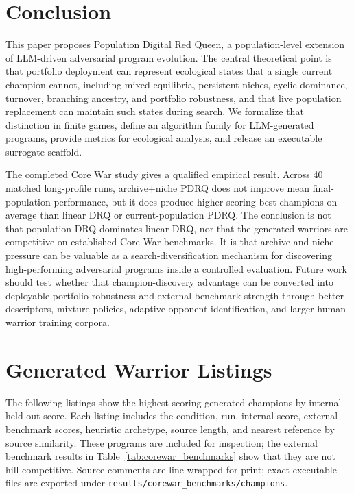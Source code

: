 \documentclass[11pt]{article}
\begin{document}
\section{Conclusion}

This paper proposes Population Digital Red Queen, a population-level extension of LLM-driven adversarial program evolution. The central theoretical point is that portfolio deployment can represent ecological states that a single current champion cannot, including mixed equilibria, persistent niches, cyclic dominance, turnover, branching ancestry, and portfolio robustness, and that live population replacement can maintain such states during search. We formalize that distinction in finite games, define an algorithm family for LLM-generated programs, provide metrics for ecological analysis, and release an executable surrogate scaffold.

The completed Core War study gives a qualified empirical result. Across 40 matched long-profile runs, archive+niche PDRQ does not improve mean final-population performance, but it does produce higher-scoring best champions on average than linear DRQ or current-population PDRQ. The conclusion is not that population DRQ dominates linear DRQ, nor that the generated warriors are competitive on established Core War benchmarks. It is that archive and niche pressure can be valuable as a search-diversification mechanism for discovering high-performing adversarial programs inside a controlled evaluation. Future work should test whether that champion-discovery advantage can be converted into deployable portfolio robustness and external benchmark strength through better descriptors, mixture policies, adaptive opponent identification, and larger human-warrior training corpora.

\appendix
\section{Generated Warrior Listings}
\label{app:generated_warriors}

The following listings show the highest-scoring generated champions by internal held-out score. Each listing includes the condition, run, internal score, external benchmark scores, heuristic archetype, source length, and nearest reference by source similarity. These programs are included for inspection; the external benchmark results in Table~\ref{tab:corewar_benchmarks} show that they are not hill-competitive. Source comments are line-wrapped for print; exact executable files are exported under \texttt{results/corewar\_benchmarks/champions}.
\end{document}
